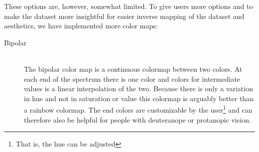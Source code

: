 		\clearpage
		
		These options are, however, somewhat limited.
		To give users more options and to make the dataset more insightful for easier inverse mapping of the dataset and aesthetics, we have implemented more color maps:
		\begin{description}
			\item[Bipolar] ~\\
			The bipolar color map is a continuous colormap between two colors. 
			At each end of the spectrum there is one color and colors for intermediate values is a linear interpolation of the two.
			Because there is only a variation in hue and not in saturation or value this colormap is arguably better than a rainbow colormap.
			The end colors are customizable by the user\footnote{That is, the hue can be adjusted} and can therefore also be helpful for people with deuteranope or protanopic vision.\cite{moreland2009diverging}
			\begin{figure}[htb]
				\centering

\end{figure}
\end{description}
